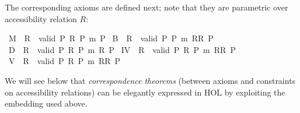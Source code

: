 \begin{isabellebody}
%
\begin{isamarkuptext}%
The corresponding axioms are defined next; note that they are parametric over accessibility 
relation $R$:%
\end{isamarkuptext}%
\isamarkuptrue%
\isamarkupfalse%
\ {\isachardoublequoteopen}M\ {\isasymequiv}\ {\isasymlambda}R\ {\isachardot}\ valid\ {\isacharparenleft}{\isasymforall}{\isacharparenleft}{\isasymlambda}P{\isachardot}\ {\isacharparenleft}{\isasymbox}\isactrlsup R\ P{\isacharparenright}\ {\isasymrightarrow}\isactrlsup m\ P{\isacharparenright}{\isacharparenright}{\isachardoublequoteclose}\isanewline
{}\isamarkupfalse%
\ {\isachardoublequoteopen}B\ {\isasymequiv}\ {\isasymlambda}R\ {\isachardot}\ valid\ {\isacharparenleft}{\isasymforall}{\isacharparenleft}{\isasymlambda}P{\isachardot}\ P\ {\isasymrightarrow}\isactrlsup m\ {\isasymbox}\isactrlsup R{\isasymdiamond}\isactrlsup R\ P{\isacharparenright}{\isacharparenright}{\isachardoublequoteclose}\isanewline
{}\isamarkupfalse%
\ {\isachardoublequoteopen}D\ {\isasymequiv}\ {\isasymlambda}R\ {\isachardot}\ valid\ {\isacharparenleft}{\isasymforall}{\isacharparenleft}{\isasymlambda}P{\isachardot}\ {\isacharparenleft}{\isasymbox}\isactrlsup R\ P{\isacharparenright}\ {\isasymrightarrow}\isactrlsup m\ {\isasymdiamond}\isactrlsup R\ P{\isacharparenright}{\isacharparenright}{\isachardoublequoteclose}\isanewline
{}\isamarkupfalse%
\ {\isachardoublequoteopen}IV\ {\isasymequiv}\ {\isasymlambda}R\ {\isachardot}\ valid\ {\isacharparenleft}{\isasymforall}{\isacharparenleft}{\isasymlambda}P{\isachardot}\ {\isacharparenleft}{\isasymbox}\isactrlsup R\ P{\isacharparenright}\ {\isasymrightarrow}\isactrlsup m\ {\isasymbox}\isactrlsup R{\isasymbox}\isactrlsup R\ P{\isacharparenright}{\isacharparenright}{\isachardoublequoteclose}\isanewline
{}\isamarkupfalse%
\ {\isachardoublequoteopen}V\ {\isasymequiv}\ {\isasymlambda}R\ {\isachardot}\ valid\ {\isacharparenleft}{\isasymforall}{\isacharparenleft}{\isasymlambda}P{\isachardot}\ {\isacharparenleft}{\isasymdiamond}\isactrlsup R\ P{\isacharparenright}\ {\isasymrightarrow}\isactrlsup m\ {\isasymbox}\isactrlsup R{\isasymdiamond}\isactrlsup R\ P{\isacharparenright}{\isacharparenright}{\isachardoublequoteclose}%
\begin{isamarkuptext}%
We will see below that \emph{correspondence theorems} (between axioms and constraints on accessibility relations)
can be elegantly expressed in HOL by exploiting the embedding used above.

\end{isamarkuptext}
\end{isabellebody}
